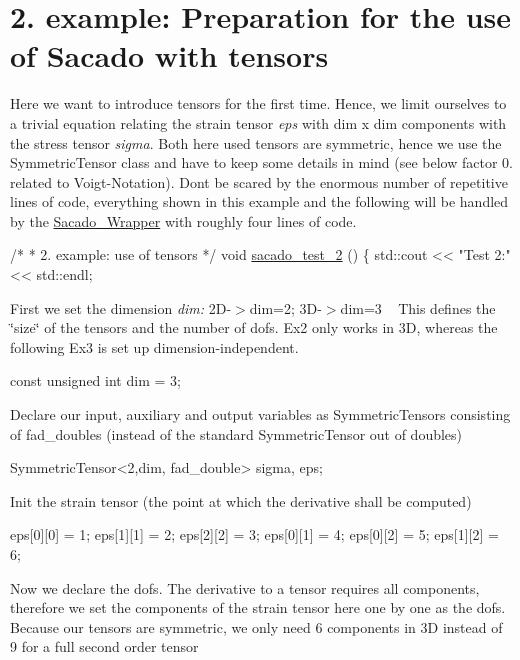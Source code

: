  \hypertarget{index_Ex2}{}\section{2. example\+: Preparation for the use of Sacado with tensors}\label{index_Ex2}
Here we want to introduce tensors for the first time. Hence, we limit ourselves to a trivial equation relating the strain tensor {\itshape eps} with dim x dim components with the stress tensor {\itshape sigma}. Both here used tensors are symmetric, hence we use the Symmetric\+Tensor class and have to keep some details in mind (see below factor 0. related to Voigt-\/\+Notation). Don\textquotesingle{}t be scared by the enormous number of repetitive lines of code, everything shown in this example and the following will be handled by the \hyperlink{namespaceSacado__Wrapper}{Sacado\+\_\+\+Wrapper} with roughly four lines of code. 
\begin{DoxyCode}
\textcolor{comment}{/*}
\textcolor{comment}{ * 2. example: use of tensors}
\textcolor{comment}{ */}
\textcolor{keywordtype}{void} \hyperlink{Sacado__example_8cc_a8ef4ff1e9526ca8451cdcd1678366d2c}{sacado\_test\_2} ()
\{
    std::cout << \textcolor{stringliteral}{"Test 2:"} << std::endl;
\end{DoxyCode}
 First we set the dimension {\itshape dim\+:} 2\+D-\/$>$dim=2; 3\+D-\/$>$dim=3 ~\newline
 This defines the \char`\"{}size\char`\"{} of the tensors and the number of dofs. Ex2 only works in 3D, whereas the following Ex3 is set up dimension-\/independent. 
\begin{DoxyCode}
\textcolor{keyword}{const} \textcolor{keywordtype}{unsigned} \textcolor{keywordtype}{int} dim = 3;
\end{DoxyCode}
 Declare our input, auxiliary and output variables as Symmetric\+Tensors consisting of fad\+\_\+doubles (instead of the standard Symmetric\+Tensor out of doubles) 
\begin{DoxyCode}
SymmetricTensor<2,dim, fad\_double> sigma, eps;
\end{DoxyCode}
 Init the strain tensor (the point at which the derivative shall be computed) 
\begin{DoxyCode}
eps[0][0] = 1;
eps[1][1] = 2;
eps[2][2] = 3;
eps[0][1] = 4;
eps[0][2] = 5;
eps[1][2] = 6;
\end{DoxyCode}
 Now we declare the dofs. The derivative to a tensor requires all components, therefore we set the components of the strain tensor here one by one as the dofs. Because our tensors are symmetric, we only need 6 components in 3D instead of 9 for a full second order tensor 
